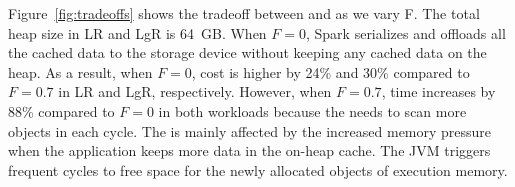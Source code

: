 Figure~\ref{fig:tradeoffs} shows the tradeoff between \teraheapGC and \teraheapSD as we vary F.
The total heap size in LR and LgR is \SI{64}{GB}.
When $F=0$, Spark serializes and offloads all the cached data to the storage device without keeping any cached data on the heap.
As a result, when $F=0$, \teraheapSD cost is higher by 24\% and 30\% compared to $F=0.7$ in LR and LgR, respectively.
However, when $F=0.7$, \teraheapGC time increases by 88\% compared to $F=0$ in both workloads because the \teraheapGC needs to scan more objects in each \teraheapGC cycle.
The \teraheapGC is mainly affected by the increased memory pressure when the application keeps more data in the on-heap cache.
The JVM triggers frequent \teraheapGC{} cycles to free space for the newly allocated objects of execution memory.

%
%
%
%
